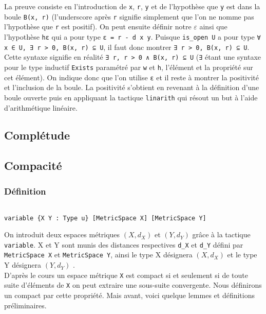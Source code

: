 \documentclass[a4paper, 12pt]{article}
\newcommand{\lean}[1]{\texttt{#1}}
\begin{document}
La preuve consiste en l'introduction de \lean{x}, \lean{r}, \lean{y} et de l'hypothèse que \lean{y} est dans la boule \lean{B(x, r)} (l'underscore après \lean{r} signifie simplement que l'on ne nomme pas l'hypothèse que \lean{r} est positif). On peut ensuite définir notre $ε$ ainsi que l'hypothèse \lean{hε} qui a pour type \lean{ε = r - d x y}. Puisque \lean{is_open U} a pour type \lean{∀ x ∈ U, ∃ r > 0, B(x, r) ⊆ U}, il faut donc montrer \lean{∃ r > 0, B(x, r) ⊆ U}. Cette syntaxe signifie en réalité \lean{∃ r, r > 0 ∧ B(x, r) ⊆ U} (\lean{∃} étant une syntaxe pour le type inductif \lean{Exists} paramétré par \lean{w} et \lean{h}, l'élément et la propriété sur cet élément). On indique donc que l'on utilise \lean{ε} et il reste à montrer la positivité et l'inclusion de la boule. La positivité s'obtient en revenant à la définition d'une boule ouverte puis en appliquant la tactique \lean{linarith} qui résout un but à l'aide d'arithmétique linéaire.

\subsection{Complétude}


\subsection{Compacité}

\subsubsection{Définition}

\begin{verbatim}

variable {X Y : Type u} [MetricSpace X] [MetricSpace Y]

\end{verbatim}

On introduit deux espaces métriques $(X,d_{X})$ et  $(Y,d_{Y})$ grâce à la tactique \lean{variable}. X et Y sont munis des distances respectives \lean{d_{X}} et \lean{d_{Y}} défini par \lean{MetricSpace X} et \lean{MetricSpace Y}, ainsi le type X désignera  $(X,d_{X})$ et le type Y désignera $(Y,d_{Y})$ .\\

D'après le cours un espace métrique \lean{X} est compact si et seulement si de toute suite d'éléments de \lean{X} on peut extraire une sous-suite convergente. Nous définirons un compact par cette propriété. Mais avant, voici quelque lemmes et définitions préliminaires. 
\end{document}
